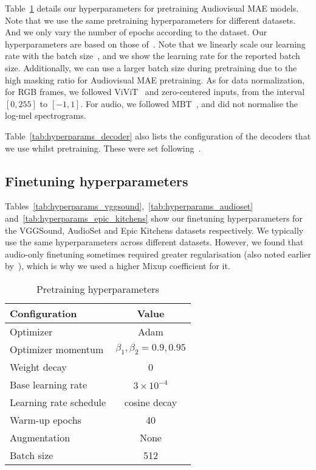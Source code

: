 \documentclass[10pt,twocolumn,letterpaper]{article}
\begin{document}
Table~\ref{tab:hyperparams_pretraining} details our hyperparameters for pretraining Audiovisual MAE models.
Note that we use the same pretraining hyperparameters for different datasets.
And we only vary the number of epochs according to the dataset.
Our hyperparameters are based on those of~\cite{he2022masked, tong2022videomae, feichtenhofer2022masked}.
Note that we linearly scale our learning rate with the batch size~\cite{goyal2017accurate}, and we show the learning rate for the reported batch size.
Additionally, we can use a larger batch size during pretraining due to the high masking ratio for Audiovisual MAE pretraining.
As for data normalization, for RGB frames, we followed ViViT~\cite{arnab2021vivit} and zero-centered inputs, from the interval $[0, 255]$ to $[-1, 1]$.
For audio, we followed MBT~\cite{nagrani2021attention}, and did not normalise the log-mel spectrograms.

Table~\ref{tab:hyperparams_decoder} also lists the configuration of the decoders that we use whilst pretraining. 
These were set following~\cite{he2022masked,feichtenhofer2022masked,tong2022videomae}.


\subsection{Finetuning hyperparameters}

Tables~\ref{tab:hyperparams_vggsound},~\ref{tab:hyperparams_audioset} and~\ref{tab:hyperparams_epic_kitchens} show our finetuning hyperparameters for the VGGSound, AudioSet and Epic Kitchens datasets respectively.
We typically use the same hyperparameters across different datasets.
However,  we found that audio-only finetuning sometimes required greater regularisation (also noted earlier by~\cite{wang2020makes}), which is why we used a higher Mixup coefficient for it. 

\begin{table}[t] 
	\caption{Pretraining hyperparameters}
	\vspace{-0.6\baselineskip}
	\centering
		\begin{tabular}{lc}
			\toprule 
			Configuration          & Value \\
			\midrule 
			Optimizer              &    Adam    \\
			Optimizer momentum     &   $\beta_1, \beta_2=0.9, 0.95$ \\ 
			Weight decay           & 0 \\
			Base learning rate     & $3 \times 10^{-4}$ \\ Learning rate schedule & cosine decay   \\ 
			Warm-up epochs         &  40  \\ 
			Augmentation           & None  \\
			Batch size             & 512    \\ 
		 
			\bottomrule 
		\end{tabular} 
		\label{tab:hyperparams_pretraining}
\end{table}
\end{document}
